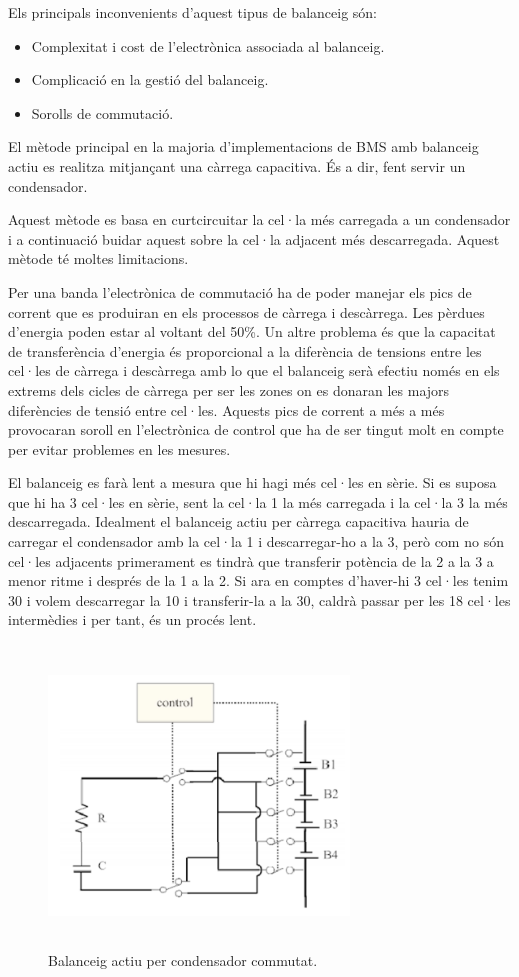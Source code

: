 Els principals inconvenients d'aquest tipus de balanceig són:
\begin{itemize}
    \item Complexitat i cost de l'electrònica associada al balanceig.
    \item Complicació en la gestió del balanceig.
    \item Sorolls de commutació.
\end{itemize}

El mètode principal en la majoria d'implementacions de BMS amb balanceig actiu es realitza mitjançant una càrrega capacitiva. És a dir, fent servir un condensador.

Aquest mètode es basa en curtcircuitar la cel·la més carregada a un condensador i a continuació buidar aquest sobre la cel·la adjacent més descarregada. Aquest mètode té moltes limitacions.

Per una banda l'electrònica de commutació ha de poder manejar els pics de corrent que es produiran en els processos de càrrega i descàrrega. Les pèrdues d'energia poden estar al voltant del 50\%. Un altre problema és que la capacitat de transferència d'energia és proporcional a la diferència de tensions entre les cel·les de càrrega i descàrrega amb lo que el balanceig serà efectiu només en els extrems dels cicles de càrrega per ser les zones on es donaran les majors diferències de tensió entre cel·les. Aquests pics de corrent a més a més provocaran soroll en l'electrònica de control que ha de ser tingut molt en compte per evitar problemes en les mesures.

El balanceig es farà lent a mesura que hi hagi més cel·les en sèrie. Si es suposa que hi ha 3 cel·les en sèrie, sent la cel·la 1 la més carregada i la cel·la 3 la més descarregada. Idealment el balanceig actiu per càrrega capacitiva hauria de carregar el condensador amb la cel·la 1 i descarregar-ho a la 3, però com no són cel·les adjacents primerament es tindrà que transferir potència de la 2 a la 3 a menor ritme i després de la 1 a la 2. Si ara en comptes d'haver-hi 3 cel·les tenim 30 i volem descarregar la 10 i transferir-la a la 30, caldrà passar per les 18 cel·les intermèdies i per tant, és un procés lent.

\begin{figure}[H]
	\centering
    \includegraphics[width=8cm, height=8cm] {BMS/balanceoactivocondensador.png}
    \caption{Balanceig actiu per condensador commutat.}
\end{figure}  

